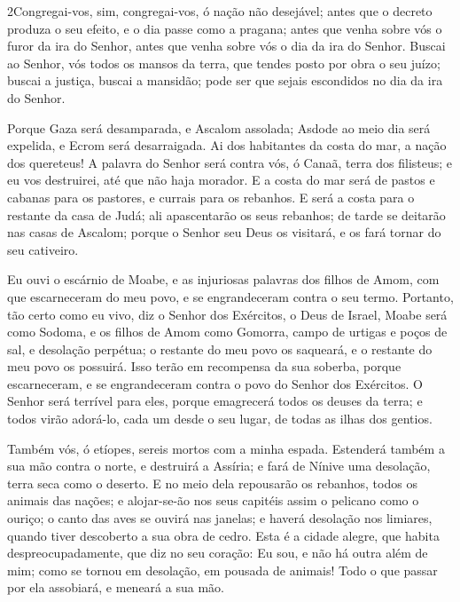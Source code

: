 \medskip

\lettrine{2} Congregai-vos, sim, congregai-vos, ó nação não
desejável; antes que o decreto produza o seu efeito, e o dia
passe como a pragana; antes que venha sobre vós o furor da ira do
Senhor, antes que venha sobre vós o dia da ira do Senhor. Buscai
ao Senhor, vós todos os mansos da terra, que tendes posto por obra o
seu juízo; buscai a justiça, buscai a mansidão; pode ser que sejais
escondidos no dia da ira do Senhor.

Porque Gaza será desamparada, e Ascalom assolada; Asdode ao meio
dia será expelida, e Ecrom será desarraigada. Ai dos habitantes
da costa do mar, a nação dos quereteus! A palavra do Senhor será
contra vós, ó Canaã, terra dos filisteus; e eu vos destruirei, até
que não haja morador. E a costa do mar será de pastos e cabanas
para os pastores, e currais para os rebanhos. E será a costa
para o restante da casa de Judá; ali apascentarão os seus rebanhos;
de tarde se deitarão nas casas de Ascalom; porque o Senhor seu Deus
os visitará, e os fará tornar do seu cativeiro.

Eu ouvi o escárnio de Moabe, e as injuriosas palavras dos filhos
de Amom, com que escarneceram do meu povo, e se engrandeceram contra
o seu termo. Portanto, tão certo como eu vivo, diz o Senhor dos
Exércitos, o Deus de Israel, Moabe será como Sodoma, e os filhos de
Amom como Gomorra, campo de urtigas e poços de sal, e desolação
perpétua; o restante do meu povo os saqueará, e o restante do meu
povo os possuirá. Isso terão em recompensa da sua soberba,
porque escarneceram, e se engrandeceram contra o povo do Senhor dos
Exércitos. O Senhor será terrível para eles, porque
emagrecerá todos os deuses da terra; e todos virão adorá-lo, cada um
desde o seu lugar, de todas as ilhas dos gentios.

Também vós, ó etíopes, sereis mortos com a minha espada.
Estenderá também a sua mão contra o norte, e destruirá a
Assíria; e fará de Nínive uma desolação, terra seca como o deserto.
E no meio dela repousarão os rebanhos, todos os animais das
nações; e alojar-se-ão nos seus capitéis assim o pelicano como o
ouriço; o canto das aves se ouvirá nas janelas; e haverá desolação
nos limiares, quando tiver descoberto a sua obra de cedro.
Esta é a cidade alegre, que habita despreocupadamente, que
diz no seu coração: Eu sou, e não há outra além de mim; como se
tornou em desolação, em pousada de animais! Todo o que passar por
ela assobiará, e meneará a sua mão.

\medskip

